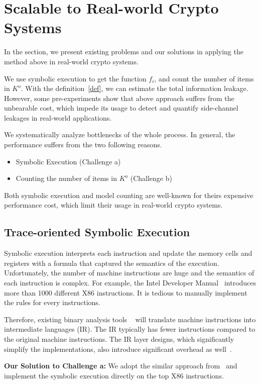 \section{Scalable to Real-world Crypto Systems}

In the section, we present existing problems and our solutions
in applying the method above in real-world crypto systems. 

We use symbolic execution to get the function $f_i$, and count 
the number of items in $K^o$.
With the definition~\ref{def}, we can estimate the total information leakage.
However, some pre-experiments show that above approach suffers from the unbearable cost, 
which impede its usage
to detect and quantify side-channel leakages in real-world applications. 

We systematically analyze bottlenecks of the whole process. In general, the performance suffers
from the two following reasons. 
\begin{itemize}
    \item Symbolic Execution (Challenge a)
    \item Counting the number of items in $K^o$ (Challenge b)
\end{itemize}

Both symbolic execution and model counting are well-known for theirs
expensive performance cost, which limit their usage in real-world
crypto systems.

\subsection{Trace-oriented Symbolic Execution}
Symbolic execution interprets each instruction and update the memory cells and registers with a 
formula that captured the semantics of the execution. Unfortunately, the number of machine instructions 
are huge and the semantics of each instruction is complex. For example, the Intel Developer Manual~\cite{intelsys}
introduces more than 1000 different X86 instructions. It is tedious to manually implement the
rules for every instructions.

Therefore, existing binary analysis tools ~\cite{shoshitaishvili2016state, 10.1007/978-3-642-22110-1_37} 
will translate machine instructions into intermediate languages (IR). The IR typically has fewer 
instructions compared to the original machine instructions. The IR layer designs, which significantly
simplify the implementations, also introduce significant overhead as well~\cite{217563}.

\vspace*{6pt}
\textbf{Our Solution to Challenge a:}
We adopt the similar approach from~\cite{217563} and implement the symbolic execution 
directly on the top X86 instructions.


